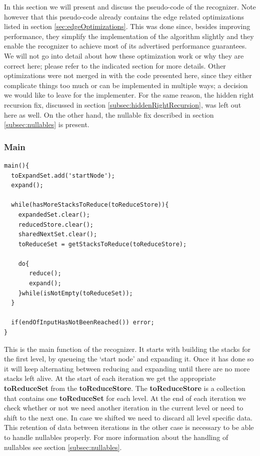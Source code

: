 \documentclass[a4paper,10pt]{article}
\begin{document}
In this section we will present and discuss the pseudo-code of the recognizer. Note however that this pseudo-code already contains the edge related optimizations listed in section \ref{sec:edgeOptimizations}. This was done since, besides improving performance, they simplify the implementation of the algorithm slightly and they enable the recognizer to achieve most of its advertised performance guarantees. We will not go into detail about how these optimization work or why they are correct here; please refer to the indicated section for more details. Other optimizations were not merged in with the code presented here, since they either complicate things too much or can be implemented in multiple ways; a decision we would like to leave for the implementer. For the same reason, the hidden right recursion fix, discussed in section \ref{subsec:hiddenRightRecursion}, was left out here as well. On the other hand, the nullable fix described in section \ref{subsec:nullables} is present.

\subsubsection{Main}
{\small
\begin{verbatim}
main(){
  toExpandSet.add('startNode');
  expand();
  
  while(hasMoreStacksToReduce(toReduceStore)){
    expandedSet.clear();
    reducedStore.clear();
    sharedNextSet.clear();
    toReduceSet = getStacksToReduce(toReduceStore);
    
    do{
       reduce();
       expand();
    }while(isNotEmpty(toReduceSet));
  }
  
  if(endOfInputHasNotBeenReached()) error;
}
\end{verbatim}
}

This is the main function of the recognizer. It starts with building the stacks for the first level, by queueing the `start node' and expanding it. Once it has done so it will keep alternating between reducing and expanding until there are no more stacks left alive. At the start of each iteration we get the appropriate {\bf toReduceSet} from the {\bf toReduceStore}. The {\bf toReduceStore} is a collection that contains one {\bf toReduceSet} for each level. At the end of each iteration we check whether or not we need another iteration in the current level or need to shift to the next one. In case we shifted we need to discard all level specific data. This retention of data between iterations in the other case is necessary to be able to handle nullables properly. For more information about the handling of nullables see section \ref{subsec:nullables}.
\end{document}
